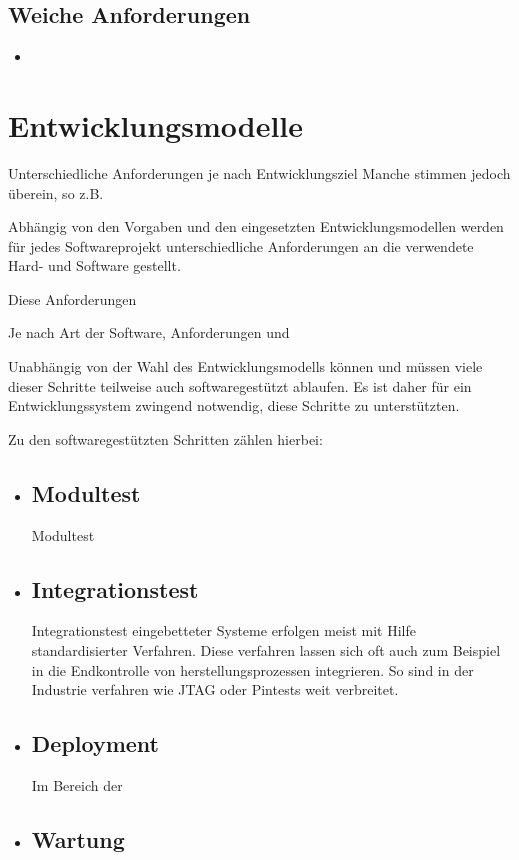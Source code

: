 \subsection{Weiche Anforderungen}
\begin{itemize}
  \item 
\end{itemize}


\section{Entwicklungsmodelle}
Unterschiedliche Anforderungen je nach Entwicklungsziel
Manche stimmen jedoch überein, so z.B.
  



Abhängig von den Vorgaben und den eingesetzten Entwicklungsmodellen werden
für jedes Softwareprojekt unterschiedliche Anforderungen an die verwendete Hard-
und Software gestellt.

Diese Anforderungen 

 Je nach Art der Software, Anforderungen und

Unabhängig von der Wahl des Entwicklungsmodells können und
müssen viele dieser Schritte teilweise auch softwaregestützt ablaufen. Es ist
daher für ein Entwicklungssystem zwingend notwendig, diese Schritte zu
unterstützten.

Zu den softwaregestützten Schritten zählen hierbei:
\begin{itemize}
  \item \subsection*{Modultest} Modultest
  \item \subsection*{Integrationstest} Integrationstest eingebetteter Systeme
  erfolgen meist mit Hilfe standardisierter Verfahren. Diese verfahren lassen
  sich oft auch zum Beispiel in die Endkontrolle von herstellungsprozessen
  integrieren. So sind in der Industrie verfahren wie JTAG oder Pintests weit
  verbreitet.
  \item \subsection*{Deployment} Im Bereich der 
  \item \subsection*{Wartung}
\end{itemize}

